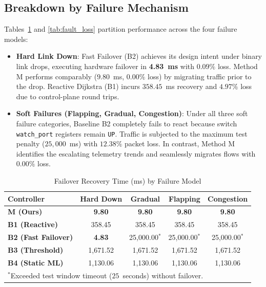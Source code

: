 \documentclass[journal,10pt,twocolumn]{IEEEtran}
\begin{document}
\subsection{Breakdown by Failure Mechanism}
Tables~\ref{tab:fault_recovery} and \ref{tab:fault_loss} partition performance across the four failure models:
\begin{itemize}
    \item \textbf{Hard Link Down}: Fast Failover (B2) achieves its design intent under binary link drops, executing hardware failover in \textbf{4.83~ms} with $0.09\%$ loss. Method M performs comparably ($9.80$~ms, $0.00\%$ loss) by migrating traffic prior to the drop. Reactive Dijkstra (B1) incurs $358.45$~ms recovery and $4.97\%$ loss due to control-plane round trips.
    \item \textbf{Soft Failures (Flapping, Gradual, Congestion)}: Under all three soft failure categories, Baseline B2 completely fails to react because switch \texttt{watch\_port} registers remain \texttt{UP}. Traffic is subjected to the maximum test penalty ($25{,}000$~ms) with $12.38\%$ packet loss. In contrast, Method M identifies the escalating telemetry trends and seamlessly migrates flows with $0.00\%$ loss.
\end{itemize}

\begin{table}[!t]
\centering
\caption{Failover Recovery Time (ms) by Failure Model}
\label{tab:fault_recovery}
\begin{tabular}{lcccc}
\toprule
\textbf{Controller} & \textbf{Hard Down} & \textbf{Gradual} & \textbf{Flapping} & \textbf{Congestion} \\
\midrule
\textbf{M (Ours)} & \textbf{9.80} & \textbf{9.80} & \textbf{9.80} & \textbf{9.80} \\
\textbf{B1 (Reactive)} & 358.45 & 358.45 & 358.45 & 358.45 \\
\textbf{B2 (Fast Failover)} & \textbf{4.83} & 25,000.00$^*$ & 25,000.00$^*$ & 25,000.00$^*$ \\
\textbf{B3 (Threshold)} & 1,671.52 & 1,671.52 & 1,671.52 & 1,671.52 \\
\textbf{B4 (Static ML)} & 1,130.06 & 1,130.06 & 1,130.06 & 1,130.06 \\
\bottomrule
\multicolumn{5}{l}{$^*$Exceeded test window timeout ($25$~seconds) without failover.}
\end{tabular}
\end{table}
\end{document}
